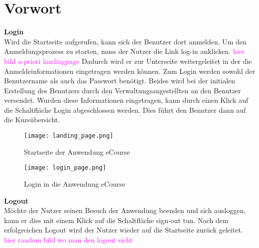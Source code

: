 
\chapter{Vorwort}
\label{sec:chapAllgemein} 
\textbf{Login}\\
Wird die Startseite aufgerufen, kann sich der Benutzer dort anmelden. Um den Anmeldungsprozess zu starten, muss der Nutzer die Link \glqq log-in\grqq\: anklicken. 
\textcolor{magenta}{hier bild a-priori landingpage}
Dadurch wird er zur Unterseite weitergeleitet in der die Anmeldeinformationen eingetragen werden können. Zum Login werden sowohl der Benutzername als auch das Passwort benötigt. Beides wird bei der initialen Erstellung des Benutzers durch den Verwaltungsangestellten an den Benutzer versendet. Wurden diese Informationen eingetragen, kann durch einen Klick auf die Schaltfläche \glqq Login\grqq\: abgeschlossen werden.
Dies führt den Benutzer dann auf die Kursübersicht.

\begin{figure}[h]
\centering
\texttt{[image: landing\_page.png]}
\caption{Startseite der Anwendung eCourse}
\label{fib:start}
\end{figure}


\begin{figure}[h]
\centering
\texttt{[image: login\_page.png]}
\caption{Login in die Anwendung eCourse}
\label{fib:Log}
\end{figure}

\textbf{Logout}\\
Möchte der Nutzer seinen Besuch der Anwendung beenden und sich ausloggen, kann er dies mit einem Klick auf die Schaltfläche \glqq sign-out\grqq\: tun. Nach dem erfolgreichen Logout wird der Nutzer wieder auf die Startseite zurück geleitet.
\textcolor{magenta}{hier random bild wo man den logout sieht}